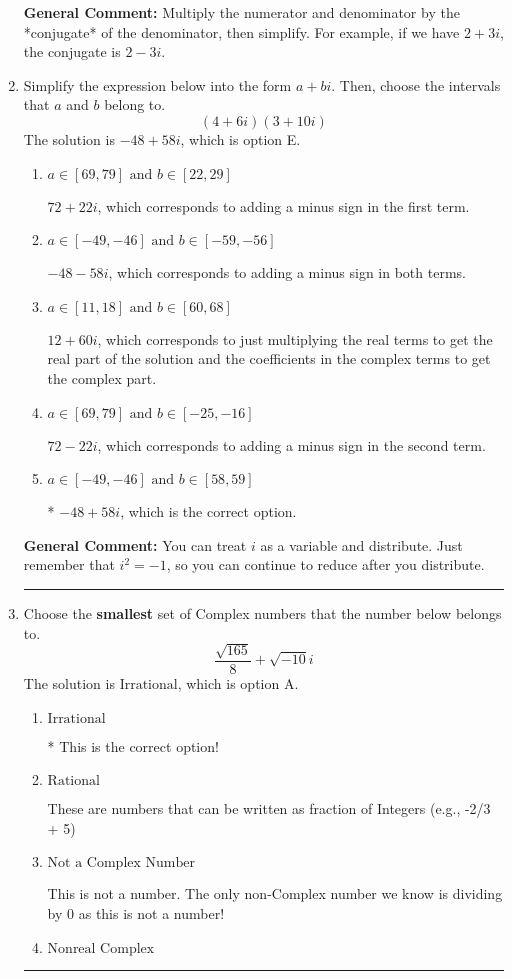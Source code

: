 \documentclass{extbook}[14pt]
\newcommand{\litem}[1]{\item #1

\rule{\textwidth}{0.4pt}}
\begin{document}
\begin{enumerate}
{\textbf{General Comment:} Multiply the numerator and denominator by the *conjugate* of the denominator, then simplify. For example, if we have $2+3i$, the conjugate is $2-3i$.
}
\litem{
Simplify the expression below into the form $a+bi$. Then, choose the intervals that $a$ and $b$ belong to.
\[ (4 + 6 i)(3 + 10 i) \]The solution is \( -48 + 58 i \), which is option E.\begin{enumerate}[label=\Alph*.]
\item \( a \in [69, 79] \text{ and } b \in [22, 29] \)

 $72 + 22 i$, which corresponds to adding a minus sign in the first term.
\item \( a \in [-49, -46] \text{ and } b \in [-59, -56] \)

 $-48 - 58 i$, which corresponds to adding a minus sign in both terms.
\item \( a \in [11, 18] \text{ and } b \in [60, 68] \)

 $12 + 60 i$, which corresponds to just multiplying the real terms to get the real part of the solution and the coefficients in the complex terms to get the complex part.
\item \( a \in [69, 79] \text{ and } b \in [-25, -16] \)

 $72 - 22 i$, which corresponds to adding a minus sign in the second term.
\item \( a \in [-49, -46] \text{ and } b \in [58, 59] \)

* $-48 + 58 i$, which is the correct option.
\end{enumerate}

\textbf{General Comment:} You can treat $i$ as a variable and distribute. Just remember that $i^2=-1$, so you can continue to reduce after you distribute.
}
\litem{
Choose the \textbf{smallest} set of Complex numbers that the number below belongs to.
\[ \frac{\sqrt{165}}{8}+\sqrt{-10}i \]The solution is \( \text{Irrational} \), which is option A.\begin{enumerate}[label=\Alph*.]
\item \( \text{Irrational} \)

* This is the correct option!
\item \( \text{Rational} \)

These are numbers that can be written as fraction of Integers (e.g., -2/3 + 5)
\item \( \text{Not a Complex Number} \)

This is not a number. The only non-Complex number we know is dividing by 0 as this is not a number!
\item \( \text{Nonreal Complex} \)


\end{enumerate}}
\end{enumerate}
\end{document}
